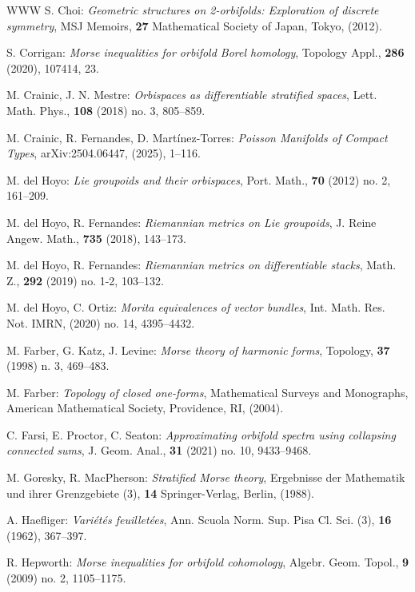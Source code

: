 \documentclass[
  a4paper, 
  reqno, 
  oneside, 
  12pt
]{amsart}
\theoremstyle{definition}
\theoremstyle{remark}
\begin{document}
\begin{thebibliography}{WWW}
 S. Choi: {\it Geometric structures on 2-orbifolds: {E}xploration of discrete symmetry}, MSJ Memoirs, {\bf 27} Mathematical Society of Japan, Tokyo, (2012).


 S. Corrigan: {\it Morse inequalities for orbifold {B}orel homology}, Topology Appl., {\bf 286} (2020), 107414, 23.


 M. Crainic, J. N. Mestre: \emph{Orbispaces as differentiable stratified spaces}, Lett. Math. Phys., {\bf 108} (2018) no. 3, 805--859.

 M. Crainic, R. Fernandes, D. Mart\'inez-Torres: \emph{Poisson Manifolds of Compact Types}, arXiv:2504.06447, (2025), 1--116.

 M. del Hoyo: \emph{Lie groupoids and their orbispaces}, Port. Math., {\bf 70} (2012) no. 2, 161--209.

 M. del Hoyo, R. Fernandes: \emph{Riemannian metrics on {L}ie groupoids}, J. Reine Angew. Math., {\bf 735}  (2018), 143--173. 

 M. del Hoyo, R. Fernandes: \emph{Riemannian metrics on differentiable stacks}, Math. Z., {\bf 292} (2019) no. 1-2, 103--132.

 M. del Hoyo, C. Ortiz: \emph{Morita equivalences of vector bundles}, Int. Math. Res. Not. IMRN, (2020) no. 14, 4395--4432.

 M. Farber, G. Katz, J. Levine: \emph{Morse theory of harmonic forms}, Topology, {\bf 37} (1998) n. 3, 469--483.

 M. Farber: \emph{Topology of closed one-forms}, Mathematical Surveys and Monographs, American Mathematical Society, Providence, RI, (2004).

 C. Farsi, E. Proctor, C. Seaton: \emph{Approximating orbifold spectra using collapsing connected sums}, J. Geom. Anal., {\bf 31} (2021) no. 10, 9433--9468.

 M. Goresky, R. MacPherson: {\it Stratified Morse theory}, Ergebnisse der Mathematik und ihrer Grenzgebiete (3), {\bf 14} Springer-Verlag, Berlin, (1988).

 A. Haefliger:  {\it Vari\'{e}t\'{e}s feuillet\'{e}es}, Ann. Scuola Norm. Sup. Pisa Cl. Sci. (3),  {\bf 16} (1962), 367--397.

 R. Hepworth:  {\it Morse inequalities for orbifold cohomology}, Algebr. Geom. Topol.,  {\bf 9} (2009) no. 2, 1105--1175.


\end{thebibliography}
\end{document}
